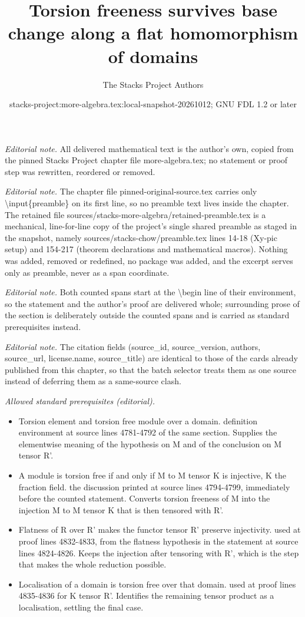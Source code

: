 \documentclass[10pt,a4paper]{amsart}
\title{Torsion freeness survives base change along a flat homomorphism of domains}
\author{The Stacks Project Authors}
\date{stacks-project:more-algebra.tex:local-snapshot-20261012; GNU FDL 1.2 or later}
\theoremstyle{plain}
\theoremstyle{definition}
\theoremstyle{remark}
\numberwithin{equation}{subsection}
\begin{document}
\maketitle
\setcounter{subsection}{1}
\noindent\textit{Editorial note.} All delivered mathematical text is the author's own, copied from the pinned Stacks Project chapter file more-algebra.tex; no statement or proof step was rewritten, reordered or removed.\par\medskip
\noindent\textit{Editorial note.} The chapter file pinned-original-source.tex carries only \textbackslash{}input\{preamble\} on its first line, so no preamble text lives inside the chapter. The retained file sources/stacks-more-algebra/retained-preamble.tex is a mechanical, line-for-line copy of the project's single shared preamble as staged in the snapshot, namely sources/stacks-chow/preamble.tex lines 14-18 (Xy-pic setup) and 154-217 (theorem declarations and mathematical macros). Nothing was added, removed or redefined, no package was added, and the excerpt serves only as preamble, never as a span coordinate.\par\medskip
\noindent\textit{Editorial note.} Both counted spans start at the \textbackslash{}begin line of their environment, so the statement and the author's proof are delivered whole; surrounding prose of the section is deliberately outside the counted spans and is carried as standard prerequisites instead.\par\medskip
\noindent\textit{Editorial note.} The citation fields (source\_id, source\_version, authors, source\_url, license.name, source\_title) are identical to those of the cards already published from this chapter, so that the batch selector treats them as one source instead of deferring them as a same-source clash.\par\medskip
\noindent\textit{Allowed standard prerequisites (editorial).}\begin{itemize}
\item Torsion element and torsion free module over a domain. definition environment at source lines 4781-4792 of the same section. Supplies the elementwise meaning of the hypothesis on M and of the conclusion on M tensor R'.
\item A module is torsion free if and only if M to M tensor K is injective, K the fraction field. the discussion printed at source lines 4794-4799, immediately before the counted statement. Converts torsion freeness of M into the injection M to M tensor K that is then tensored with R'.
\item Flatness of R over R' makes the functor tensor R' preserve injectivity. used at proof lines 4832-4833, from the flatness hypothesis in the statement at source lines 4824-4826. Keeps the injection after tensoring with R', which is the step that makes the whole reduction possible.
\item Localisation of a domain is torsion free over that domain. used at proof lines 4835-4836 for K tensor R'. Identifies the remaining tensor product as a localisation, settling the final case.
\end{itemize}\medskip
\end{document}
